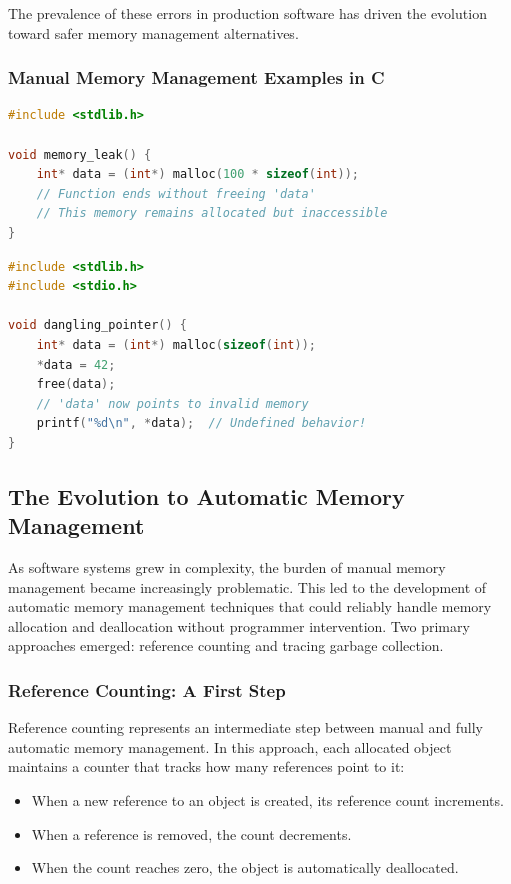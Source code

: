 \documentclass{article}
\begin{document}
The prevalence of these errors in production software has driven the evolution toward safer memory management alternatives.

\subsubsection*{Manual Memory Management Examples in C}

\begin{lstlisting}[language=C, caption=Memory Leak Example, style=mystyle]
#include <stdlib.h>

void memory_leak() {
    int* data = (int*) malloc(100 * sizeof(int));
    // Function ends without freeing 'data'
    // This memory remains allocated but inaccessible
}
\end{lstlisting}

\begin{lstlisting}[language=C, caption=Dangling Pointer Example, style=mystyle]
#include <stdlib.h>
#include <stdio.h>

void dangling_pointer() {
    int* data = (int*) malloc(sizeof(int));
    *data = 42;
    free(data);
    // 'data' now points to invalid memory
    printf("%d\n", *data);  // Undefined behavior!
}
\end{lstlisting}

\subsection{The Evolution to Automatic Memory Management}

As software systems grew in complexity, the burden of manual memory management became increasingly problematic. This led to the development of automatic memory management techniques that could reliably handle memory allocation and deallocation without programmer intervention. Two primary approaches emerged: reference counting and tracing garbage collection.

\subsubsection{Reference Counting: A First Step}

Reference counting represents an intermediate step between manual and fully automatic memory management. In this approach, each allocated object maintains a counter that tracks how many references point to it:

\begin{itemize}
    \item When a new reference to an object is created, its reference count increments.
    \item When a reference is removed, the count decrements.
    \item When the count reaches zero, the object is automatically deallocated.
\end{itemize}
\end{document}
